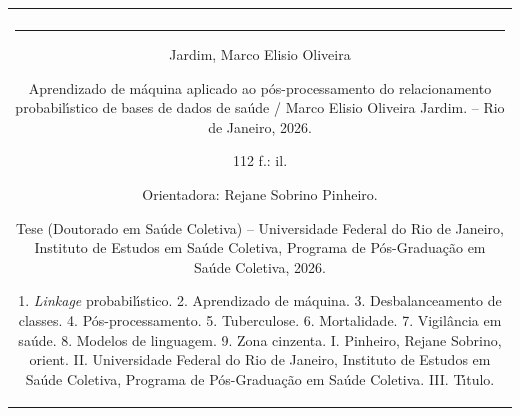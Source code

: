 \documentclass[12pt,a4paper,openany]{book}
\begin{document}
\begin{center}
\begin{tabular}{|c|}
\hline\\
\begin{minipage}{15cm}
\rule{15cm}{0pt} \flushright


\begin{minipage}{12.5cm}

Jardim, Marco Elisio Oliveira

\hspace{1,59cm} Aprendizado de m\'aquina aplicado ao p\'os-processamento do relacionamento probabil\'{\i}stico de bases de dados de sa\'ude / Marco Elisio Oliveira Jardim. -- Rio de Janeiro, 2026.

\hspace{1cm} 112 f.: il.

\hspace{1cm} Orientadora: Rejane Sobrino Pinheiro.

\hspace{1cm} Tese (Doutorado em Sa\'ude Coletiva) -- Universidade Federal do Rio de Janeiro, Instituto de Estudos em Sa\'ude Coletiva, Programa de P\'os-Gradua\c{c}\~ao em Sa\'ude Coletiva, 2026.

\hspace{1cm} 1. \textit{Linkage} probabil\'{\i}stico. 2. Aprendizado de m\'aquina. 3. Desbalanceamento de classes. 4. P\'os-processamento. 5. Tuberculose. 6. Mortalidade. 7. Vigil\^ancia em sa\'ude. 8. Modelos de linguagem. 9. Zona cinzenta. I. Pinheiro, Rejane Sobrino, orient. II. Universidade Federal do Rio de Janeiro, Instituto de Estudos em Sa\'ude Coletiva, Programa de P\'os-Gradua\c{c}\~ao em Sa\'ude Coletiva. III. T\'{\i}tulo.

\bigskip
\end{minipage}
\end{minipage}
\\
\hline
\end{tabular}
\end{center}




\end{document}
